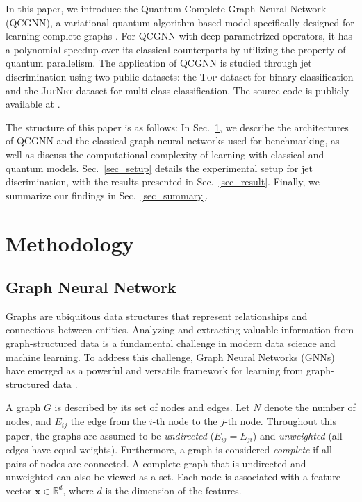 \documentclass[reprint,amsmath,amssymb,prd,nofootinbib]{revtex4-2}
\def\xbf{\mathbf{x}}
\newcommand{\Top}{\textsc{Top}\xspace}
\newcommand{\JetNet}{\textsc{JetNet}\xspace}
\begin{document}
In this paper, we introduce the Quantum Complete Graph Neural Network (QCGNN), a variational quantum algorithm \cite{vqc1,vqc2,vqc3} based model specifically designed for learning complete graphs \cite{completegraph}. For QCGNN with deep parametrized operators, it has a polynomial speedup over its classical counterparts by utilizing the property of quantum parallelism. The application of QCGNN is studied through jet discrimination using two public datasets: the \Top dataset \cite{zenodo_top,dataset_top} for binary classification and the \JetNet dataset \cite{zenodo_jetnet,dataset_jetnet} for multi-class classification. The source code is publicly available at \cite{qcgnn_zenodo}.

The structure of this paper is as follows: In Sec.~\ref{sec_method}, we describe the architectures of QCGNN and the classical graph neural networks used for benchmarking, as well as discuss the computational complexity of learning with classical and quantum models. Sec.~\ref{sec_setup} details the experimental setup for jet discrimination, with the results presented in Sec.~\ref{sec_result}. Finally, we summarize our findings in Sec.~\ref{sec_summary}.

\section{Methodology} \label{sec_method}

\subsection{Graph Neural Network} \label{sec_gnn}
Graphs are ubiquitous data structures that represent relationships and connections between entities. Analyzing and extracting valuable information from graph-structured data is a fundamental challenge in modern data science and machine learning. To address this challenge, Graph Neural Networks (GNNs) have emerged as a powerful and versatile framework for learning from graph-structured data \cite{gnnex1,gnnex2,gnnex3}.

A graph $G$ is described by its set of nodes and edges. Let $N$ denote the number of nodes, and $E_{ij}$ the edge from the $i$-th node to the $j$-th node. Throughout this paper, the graphs are assumed to be \textit{undirected} ($E_{ij}=E_{ji}$) and \textit{unweighted} (all edges have equal weights). Furthermore, a graph is considered \textit{complete} \cite{completegraph} if all pairs of nodes are connected. A complete graph that is undirected and unweighted can also be viewed as a set. Each node is associated with a feature vector $\xbf\in \mathbb{R}^{d}$, where $d$ is the dimension of the features.
\end{document}
